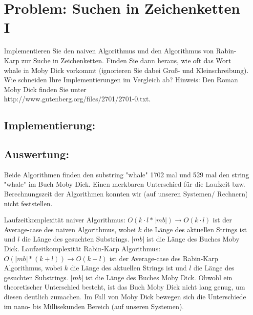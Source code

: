 \section{Problem: Suchen in Zeichenketten I}

Implementieren Sie den naiven Algorithmus und den Algorithmus von Rabin-Karp
zur Suche in Zeichenketten. Finden Sie dann heraus, wie oft das Wort whale in Moby
Dick vorkommt (ignorieren Sie dabei Groß- und Kleinschreibung). Wie schneiden
Ihre Implementierungen im Vergleich ab?
Hinweis: Den Roman Moby Dick finden Sie unter\\
http://www.gutenberg.org/files/2701/2701-0.txt.

\subsection{Implementierung:}



\newpage
\subsection{Auswertung:}
Beide Algorithmen finden den substring "whale" 1702 mal und 529 mal den string "whale" im Buch Moby Dick. Einen merkbaren Unterschied für die Laufzeit bzw. Berechnungszeit der Algorithmen konnten wir (auf unseren Systemen/ Rechnern) nicht feststellen. 

Laufzeitkomplexität naiver Algorithmus: $O(k·l*|mb|) \rightarrow O(k·l)$ ist der Average-case des naiven Algorithmus, wobei $k$ die Länge des aktuellen Strings ist und $l$ die Länge des gesuchten Substrings. $|mb|$ ist die Länge des Buches Moby Dick. Laufzeitkomplexität Rabin-Karp Algorithmus: $O(|mb|*(k+l)) \rightarrow O(k+l)$ ist der Average-case des Rabin-Karp Algorithmus, wobei $k$ die Länge des aktuellen Strings ist und $l$ die Länge des gesuchten Substrings. $|mb|$ ist die Länge des Buches Moby Dick. Obwohl ein theoretischer Unterschied besteht, ist das Buch Moby Dick nicht lang genug, um diesen deutlich zumachen. Im Fall von Moby Dick bewegen sich die Unterschiede im nano- bis Millisekunden Bereich (auf unseren Systemen).